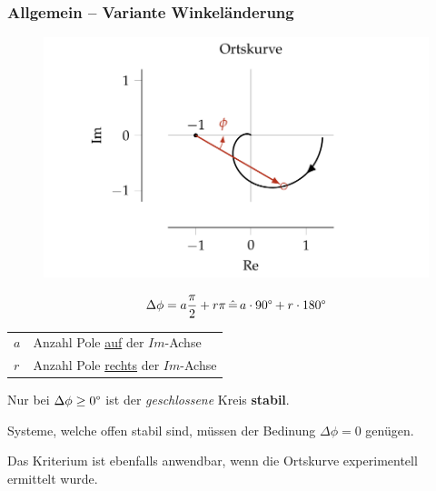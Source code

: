 \documentclass[
  10pt,
  a4paper,
  twocolumn]{article}
\makeatletter
\numberwithin{equation}{section}
\newenvironment{conditions}
  {\par\vspace{\abovedisplayskip}\noindent\begin{tabular}{>{$}l<{$} @{${}:{}$} l}}
  {\end{tabular}\par\vspace{\belowdisplayskip}}
\makeatother
\begin{document}
\hypertarget{allgemein-variante-winkeluxe4nderung}{%
\subsubsection{Allgemein -- Variante
Winkeländerung}\label{allgemein-variante-winkeluxe4nderung}}

\begin{figure}[H]

{\centering \includegraphics{images/paste-4.png}

}

\end{figure}

\[
\Delta\phi=a\frac{\pi}{2}+r\pi\,\hat{=}\,a\cdot90\degree+r\cdot180\degree
\]

\begin{conditions}
  a & Anzahl Pole \underline{auf} der $Im$-Achse\\
  r & Anzahl Pole \underline{rechts} der $Im$-Achse
\end{conditions}

Nur bei \(\Delta\phi\geq0\degree\) ist der \emph{geschlossene} Kreis
\textbf{stabil}.

\begin{tcolorbox}[enhanced jigsaw, colframe=quarto-callout-important-color-frame, toptitle=1mm, title=\textcolor{quarto-callout-important-color}{\faExclamation}\hspace{0.5em}{Offen stabile Systeme}, bottomtitle=1mm, opacityback=0, left=2mm, opacitybacktitle=0.6, bottomrule=.15mm, leftrule=.75mm, coltitle=black, titlerule=0mm, colback=white, breakable, toprule=.15mm, colbacktitle=quarto-callout-important-color!10!white, rightrule=.15mm, arc=.35mm]

Systeme, welche offen stabil sind, müssen der Bedinung \(\Delta\phi=0\)
genügen.

Das Kriterium ist ebenfalls anwendbar, wenn die Ortskurve experimentell
ermittelt wurde.

\end{tcolorbox}
\end{document}
